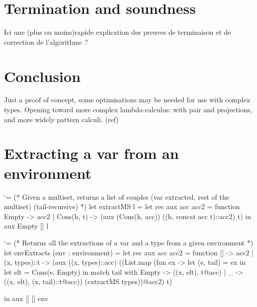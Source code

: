 \documentclass{article}
\let\origlstlisting=\lstlisting
\let\endoriglstlisting=\endlstlisting
\renewenvironment{lstlisting}
{\mathcode`\-=\hyphenmathcode
    \everymath{}\mathsurround=0pt\origlstlisting}
{\endoriglstlisting}
\begin{document}
\section{Termination and soundness}
Ici une (plus ou moins)rapide explication des preuves de terminaison et de correction de l'algorithme ?
\section{Conclusion}
Just a proof of concept, some optimisations may be needed for use with complex types.
Opening toward more complex lambda-calculus: with pair and projections, and more widely pattern calculi. (ref)


\newpage



\newpage
\appendix
\section{Extracting a var from an environment}
\label{a_extract}
\begin{lstlisting}
(* Given a multiset, returns a list of couples
(var extracted, rest of the multiset) (tail-recursive) *)
let extractMS l =
  let rec aux acc acc2 = function
    Empty -> acc2
    | Cons(h, t) -> 
  (aux (Cons(h, acc)) ((h, concat acc t)::acc2) t)
in aux Empty [] l
\end{lstlisting}


\begin{lstlisting}
(* Returns all the extractions of a var and a type 
from a given  environment *)
let envExtracts (env : environment) = 
  let rec aux acc acc2 = function
    [] -> acc2
    | (x, types)::t -> 
        (aux ((x, types)::acc) ((List.map (fun ex -> 
    let (e, tail) = ex in 
    let elt = Cons(e, Empty) in 
    match tail with
      Empty -> ((x, elt), t@acc)
      | _ -> 
((x, elt), (x, tail)::t@acc)) (extractMS types))@acc2) t) 

  in aux [] [] env
\end{lstlisting}

\newpage
\end{document}
